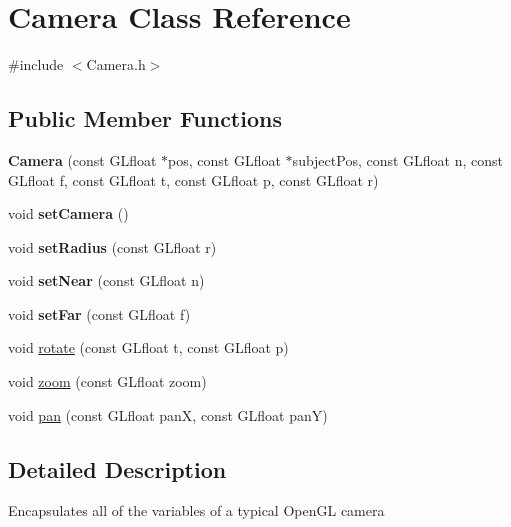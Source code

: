 \hypertarget{classCamera}{\section{Camera Class Reference}
\label{classCamera}
}


{\ttfamily \#include $<$Camera.\-h$>$}

\subsection*{Public Member Functions}
\begin{DoxyCompactItemize}
\item 
\hypertarget{classCamera_a61d3ad16da64ac0f6d465c216269e105}{{\bfseries Camera} (const G\-Lfloat $\ast$pos, const G\-Lfloat $\ast$subject\-Pos, const G\-Lfloat n, const G\-Lfloat f, const G\-Lfloat t, const G\-Lfloat p, const G\-Lfloat r)}\label{classCamera_a61d3ad16da64ac0f6d465c216269e105}

\item 
\hypertarget{classCamera_a778673e0a23face89f7bcc091d6cde90}{void {\bfseries set\-Camera} ()}\label{classCamera_a778673e0a23face89f7bcc091d6cde90}

\item 
\hypertarget{classCamera_af3391cddaba1bfee38f20e725284118a}{void {\bfseries set\-Radius} (const G\-Lfloat r)}\label{classCamera_af3391cddaba1bfee38f20e725284118a}

\item 
\hypertarget{classCamera_a589baa6aa32a8a1ee9a975c1ec1fd135}{void {\bfseries set\-Near} (const G\-Lfloat n)}\label{classCamera_a589baa6aa32a8a1ee9a975c1ec1fd135}

\item 
\hypertarget{classCamera_abe2a4e82153d1a552274ea479bbb998e}{void {\bfseries set\-Far} (const G\-Lfloat f)}\label{classCamera_abe2a4e82153d1a552274ea479bbb998e}

\item 
void \hyperlink{classCamera_a9d382e5961f3068fa7652215fe4d63c1}{rotate} (const G\-Lfloat t, const G\-Lfloat p)
\item 
void \hyperlink{classCamera_a4142153e130d5e2b54dbb5be5ba5e015}{zoom} (const G\-Lfloat zoom)
\item 
void \hyperlink{classCamera_a745b2d29dec7b633f91c6015c7e33a14}{pan} (const G\-Lfloat pan\-X, const G\-Lfloat pan\-Y)
\end{DoxyCompactItemize}


\subsection{Detailed Description}
Encapsulates all of the variables of a typical Open\-G\-L camera 

